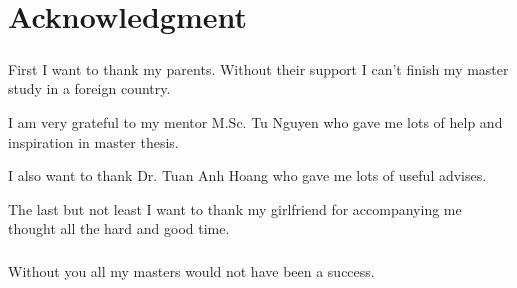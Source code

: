 \chapter{Acknowledgment}

  
\paragraph{} %
\label{par:}
First I want to thank my parents. Without their support I can't finish my master study in a foreign country. 
 
I am very grateful to my mentor M.Sc. Tu Nguyen who gave me lots of help and inspiration in master thesis.   

I also want to thank Dr. Tuan Anh Hoang who gave me lots of useful advises.

The last but not least I want to thank my girlfriend for accompanying me thought all the hard and good time. 
\paragraph{}

Without you all my masters would not have been a success. 



\paragraph{}


